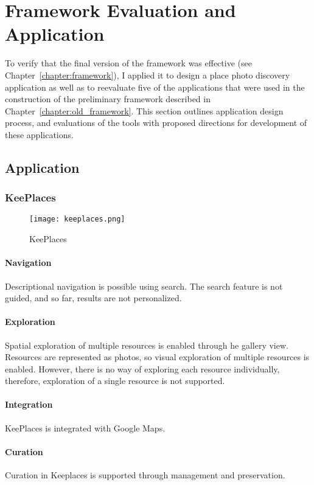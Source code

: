 \chapter{Framework Evaluation and Application}
\label{chapter:application}

To verify that the final version of the framework was effective (see Chapter~\ref{chapter:framework}), I applied it to design a place photo discovery application as well as to reevaluate five of the applications that were used in the construction of the preliminary framework described in Chapter~\ref{chapter:old_framework}. This section outlines application design process, and evaluations of the tools with proposed directions for development of these applications. 

{\section{Application}

{\subsection{KeePlaces}
\begin{figure}[ht!]
	\noindent
	\centering
	\texttt{[image: keeplaces.png]}
	\caption{KeePlaces}
	\label{fig:keeplaces} 
\end{figure}
{\subsubsection{Navigation}
Descriptional navigation is possible using search. The search feature is not guided, and so far, results are not personalized. 

}
{\subsubsection{Exploration}
Spatial exploration of multiple resources is enabled through he gallery view. 
Resources are represented as photos, so visual exploration of multiple resources is enabled. However, there is no way of exploring each resource individually, therefore, exploration of a single resource is not supported. 
}
{\subsubsection{Integration}
KeePlaces is integrated with Google Maps.
}
{\subsubsection{Curation}
Curation in Keeplaces is supported through management and preservation.

}}}

